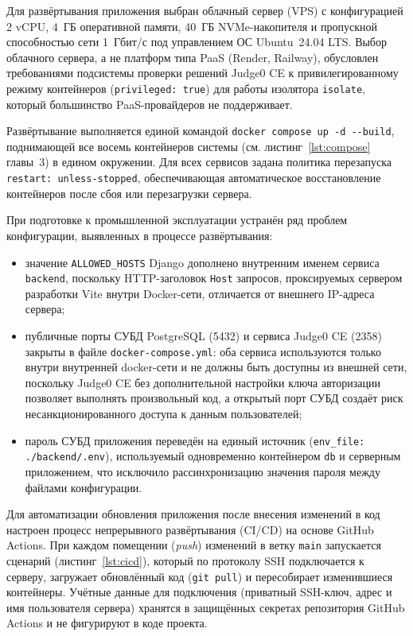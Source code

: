 Для развёртывания приложения выбран облачный сервер (VPS) с
конфигурацией 2 vCPU, 4~ГБ оперативной памяти, 40~ГБ NVMe-накопителя и
пропускной способностью сети 1~Гбит/с под управлением ОС Ubuntu~24.04
LTS. Выбор облачного сервера, а не платформ типа PaaS (Render,
Railway), обусловлен требованиями подсистемы проверки решений Judge0
CE к привилегированному режиму контейнеров (\texttt{privileged: true})
для работы изолятора \texttt{isolate}, который большинство PaaS-провайдеров
не поддерживает.

Развёртывание выполняется единой командой \texttt{docker compose up -d
-{}-build}, поднимающей все восемь контейнеров системы (см.
листинг~\ref{lst:compose} главы~3) в едином окружении. Для всех
сервисов задана политика перезапуска \texttt{restart: unless-stopped},
обеспечивающая автоматическое восстановление контейнеров после сбоя
или перезагрузки сервера.

При подготовке к промышленной эксплуатации устранён ряд проблем
конфигурации, выявленных в процессе развёртывания:

\begin{itemize}
	\item значение \texttt{ALLOWED\_HOSTS} Django дополнено внутренним
	      именем сервиса \texttt{backend}, поскольку HTTP-заголовок
	      \texttt{Host} запросов, проксируемых сервером разработки Vite
	      внутри Docker-сети, отличается от внешнего IP-адреса сервера;
	\item публичные порты СУБД PostgreSQL (5432) и сервиса Judge0 CE
	      (2358) закрыты в файле \texttt{docker-compose.yml}: оба сервиса
	      используются только внутри внутренней docker-сети и не должны
	      быть доступны из внешней сети, поскольку Judge0 CE без
	      дополнительной настройки ключа авторизации позволяет выполнять
	      произвольный код, а открытый порт СУБД создаёт риск
	      несанкционированного доступа к данным пользователей;
	\item пароль СУБД приложения переведён на единый источник
	      (\texttt{env\_file: ./backend/.env}), используемый одновременно
	      контейнером \texttt{db} и серверным приложением, что исключило
	      рассинхронизацию значения пароля между файлами конфигурации.
\end{itemize}

Для автоматизации обновления приложения после внесения изменений в
код настроен процесс непрерывного развёртывания (CI/CD) на основе
GitHub Actions. При каждом помещении (\textit{push}) изменений в ветку
\texttt{main} запускается сценарий (листинг~\ref{lst:cicd}), который по
протоколу SSH подключается к серверу, загружает обновлённый код
(\texttt{git pull}) и пересобирает изменившиеся контейнеры. Учётные
данные для подключения (приватный SSH-ключ, адрес и имя пользователя
сервера) хранятся в защищённых секретах репозитория GitHub Actions и не
фигурируют в коде проекта.

